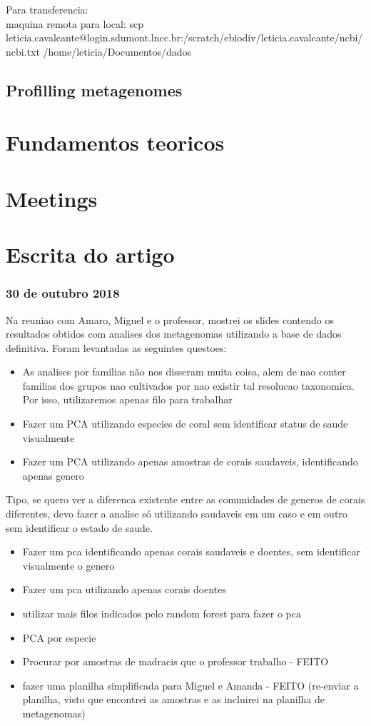 \documentclass[12pt, a4paper]{report}
\begin{document}
Para transferencia: \\
maquina remota para local:
scp leticia.cavalcante@login.sdumont.lncc.br:/scratch/ebiodiv/leticia.cavalcante/ncbi/ncbi.txt /home/leticia/Documentos/dados

\section{Profilling metagenomes}

\chapter{Fundamentos teoricos}


\chapter{Meetings}

\chapter{Escrita do artigo}

\subsection{30 de outubro 2018}
Na reuniao com Amaro, Miguel e o professor, mostrei os slides contendo os resultados obtidos com analises dos metagenomas utilizando a base de dados definitiva. Foram levantadas as seguintes questoes:
\begin{itemize}
\item As analises por familias não nos disseram muita coisa, alem de nao conter familias dos grupos nao cultivados por nao existir tal resolucao taxonomica. Por isso, utilizaremos apenas filo para trabalhar
\item Fazer um PCA utilizando especies de coral sem identificar status de saude visualmente
\item Fazer um PCA utilizando apenas amostras de corais saudaveis, identificando apenas genero
\end{itemize}
Tipo, se quero ver a diferenca existente entre as comunidades de generos de corais diferentes, devo fazer a analise só utilizando saudaveis em um caso e em outro sem identificar o estado de saude.

\begin{itemize}
\item Fazer um pca identificando apenas corais saudaveis e doentes, sem identificar visualmente o genero 
\item Fazer um pca utilizando apenas corais doentes
\item utilizar mais filos indicados pelo random forest para fazer o pca
\item PCA por especie
\item Procurar por amostras de madracis que o professor trabalho - FEITO
\item fazer uma planilha simplificada para Miguel e Amanda - FEITO (re-enviar a planilha, visto que encontrei as amostras e as incluirei na planilha de metagenomas)
\end{itemize}
\end{document}
